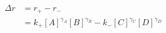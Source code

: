 \begin{eqnarray}\label{eqn:flux-def}
\Delta r & =r_+-r_- \\
&=  k_+[A]^{\gamma_A}[B]^{\gamma_B} -  k_-[C]^{\gamma_C}[D]^{\gamma_D} \\
\end{eqnarray}